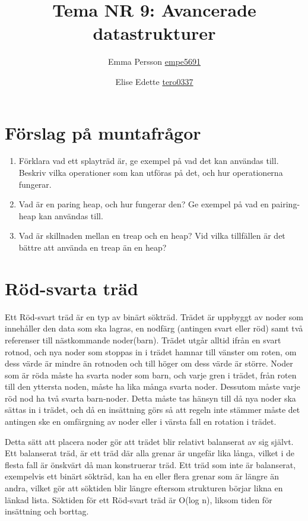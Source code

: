 \documentclass[a5paper,10pt,oneside]{article}
\title{Tema NR 9: Avancerade datastrukturer}
\author{Emma Persson \url{empe5691} \and Elise Edette \url{tero0337}}
\begin{document}
\maketitle


\section{Förslag på muntafrågor}

\begin{enumerate}

  \item Förklara vad ett splayträd är, ge exempel på vad det kan användas till. Beskriv vilka operationer som kan utföras på det, och hur operationerna fungerar. 
  
  \item Vad är en paring heap, och hur fungerar den? Ge exempel på vad en pairing-heap kan användas till. 
  
  \item Vad är skillnaden mellan en treap och en heap? Vid vilka tillfällen är det bättre att använda en treap än en heap?

\end{enumerate}
\section{Röd-svarta träd}

Ett Röd-svart träd är en typ av binärt sökträd. Trädet är uppbyggt av noder som innehåller den data som ska lagras, en nodfärg (antingen svart eller röd) samt två referenser till nästkommande noder(barn). Trädet utgår alltid ifrån en svart rotnod, och nya noder som stoppas in i trädet hamnar till vänster om roten, om dess värde är mindre än rotnoden och till höger om dess värde är större. Noder som är röda måste ha svarta noder som barn, och varje gren i trädet, från roten till den yttersta noden, måste ha lika många svarta noder. Dessutom måste varje röd nod ha två svarta barn-noder. Detta måste tas hänsyn till då nya noder ska sättas in i trädet, och då en insättning görs så att regeln inte stämmer måste det antingen ske en omfärgning av noder eller i värsta fall en rotation i trädet. 

Detta sätt att placera noder gör att trädet blir relativt balanserat av sig självt. Ett balanserat träd, är ett träd där alla grenar är ungefär lika långa, vilket i de flesta fall är önskvärt då man konstruerar träd. Ett träd som inte är balanserat, exempelvis ett binärt sökträd, kan ha en eller flera grenar som är längre än andra, vilket gör att söktiden blir längre eftersom strukturen börjar likna en länkad lista. Söktiden för ett Röd-svart träd är O(log n), liksom tiden för insättning och borttag.  
\end{document}
